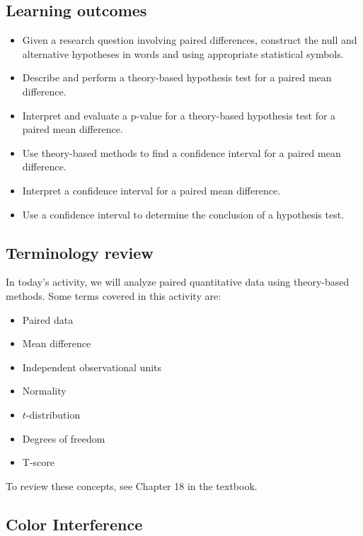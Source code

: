 \documentclass[
]{report}
\begin{document}

\hypertarget{learning-outcomes-22}{%
\subsection{Learning outcomes}\label{learning-outcomes-22}}

\begin{itemize}
\item
  Given a research question involving paired differences, construct the null and alternative hypotheses
  in words and using appropriate statistical symbols.
\item
  Describe and perform a theory-based hypothesis test for a paired mean difference.
\item
  Interpret and evaluate a p-value for a theory-based hypothesis test for a paired mean difference.
\item
  Use theory-based methods to find a confidence interval for a paired mean difference.
\item
  Interpret a confidence interval for a paired mean difference.
\item
  Use a confidence interval to determine the conclusion of a hypothesis test.
\end{itemize}

\hypertarget{terminology-review-19}{%
\subsection{Terminology review}\label{terminology-review-19}}

In today's activity, we will analyze paired quantitative data using theory-based methods. Some terms covered in this activity are:

\begin{itemize}
\item
  Paired data
\item
  Mean difference
\item
  Independent observational units
\item
  Normality
\item
  \(t\)-distribution
\item
  Degrees of freedom
\item
  T-score
\end{itemize}

To review these concepts, see Chapter 18 in the textbook.

\hypertarget{color-interference}{%
\subsection{Color Interference}\label{color-interference}}
\end{document}
